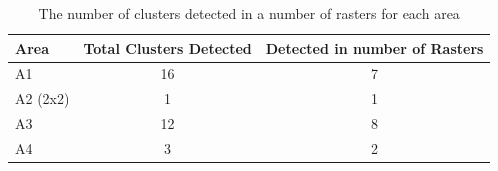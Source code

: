 \begin{table}[H]
    \centering
    \begin{tabular}{l c c }
        \toprule
        Area     & Total Clusters Detected & Detected in number of Rasters \\
        \midrule
        A1       & 16                      & 7                             \\
        A2 (2x2) & 1                       & 1                             \\
        A3       & 12                      & 8                             \\
        A4       & 3                       & 2                             \\
        \bottomrule
    \end{tabular}
    \caption{The number of clusters detected in a number of rasters for each area}
    \label{tb:pipeline-clusters-detected}
\end{table}


